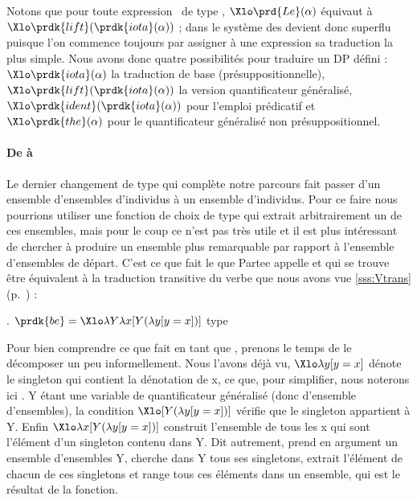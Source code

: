 \sloppy

Notons que pour toute expression \vrb\alpha\ de type \et, $\Xlo\prd{Le}(\alpha)$ équivaut à $\Xlo\prdk{lift}(\prdk{iota}(\alpha))$ ; dans le système des   devient donc superflu puisque l'on commence toujours par assigner à une expression sa traduction la plus simple.  Nous avons donc quatre possibilités pour traduire un DP défini : $\Xlo\prdk{iota}(\alpha)$ la traduction de base (présuppositionnelle), $\Xlo\prdk{lift}(\prdk{iota}(\alpha))$ la version quantificateur généralisé, $\Xlo\prdk{ident}(\prdk{iota}(\alpha))$ pour l'emploi prédicatif et $\Xlo\prdk{the}(\alpha)$ pour le quantificateur généralisé non présuppositionnel. 

\fussy

\paragraph*{De  à }

Le dernier changement de type qui complète notre parcours fait passer d'un ensemble d'ensembles d'individus à un ensemble d'individus.  Pour ce faire nous pourrions utiliser une fonction de choix de type \type{\ett,\et}  qui extrait arbitrairement un de ces ensembles, mais pour le coup ce n'est pas très utile et il est plus intéressant de chercher à produire un ensemble plus remarquable par rapport à l'ensemble d'ensembles de départ.  C'est ce que fait le  que Partee appelle  et qui se trouve être équivalent à la traduction transitive du verbe  que nous avons vue \ref{sss:Vtrans} (p.~\pageref{x:spiderman2}) :

\ex.
\(\prdk{be} = \Xlo\lambda Y\lambda x [Y(\lambda y [y=x])]\)
\hfill type \type{\ett,\et}\label{xd:BE}


Pour bien comprendre ce que fait  en tant que , prenons le temps de le décomposer un peu informellement.  Nous l'avons déjà vu, $\Xlo\lambda y[y=x]$ dénote le singleton qui contient la dénotation de \vrb x, ce que, pour simplifier, nous noterons ici .  \vrb Y étant une variable de quantificateur généralisé (donc d'ensemble d'ensembles), la condition $\Xlo [Y(\lambda y[y=x])]$ vérifie que le singleton  appartient à \vrb Y.  Enfin $\Xlo\lambda x[Y(\lambda y[y=x])]$ construit l'ensemble de tous les \vrb x qui sont l'élément d'un singleton contenu dans \vrb Y. 
Dit autrement,  prend en argument un ensemble d'ensembles \vrb Y, cherche dans \vrb Y tous ses singletons, extrait l'élément de chacun de ces singletons et range tous ces éléments dans un ensemble, qui est le résultat de la fonction.

